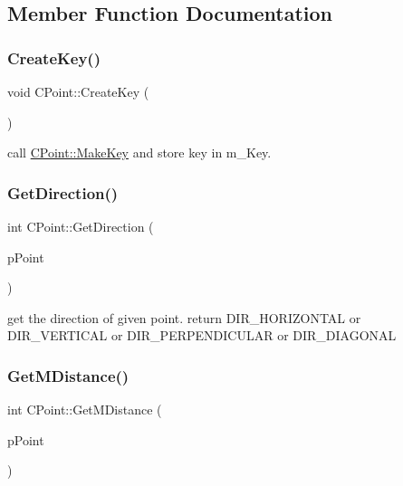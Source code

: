 \subsection{Member Function Documentation}
\mbox{\label{classCPoint_adff246311a759e9c7eaa5f5374dd3643}} 
\subsubsection{\texorpdfstring{CreateKey()}{CreateKey()}}
{\footnotesize\ttfamily void C\+Point\+::\+Create\+Key (\begin{DoxyParamCaption}{ }\end{DoxyParamCaption})}



call \mbox{\hyperlink{classCPoint_aa93327a1be5e5d9df55f3eb9750af25d}{C\+Point\+::\+Make\+Key}} and store key in m\+\_\+\+Key. 

\mbox{\label{classCPoint_add1e7b0b591f46026f281758a263da73}} 
\subsubsection{\texorpdfstring{GetDirection()}{GetDirection()}}
{\footnotesize\ttfamily int C\+Point\+::\+Get\+Direction (\begin{DoxyParamCaption}\item[{\mbox{\hyperlink{classCPoint}{C\+Point}} $\ast$}]{p\+Point }\end{DoxyParamCaption})}

get the direction of given point. return D\+I\+R\+\_\+\+H\+O\+R\+I\+Z\+O\+N\+T\+AL or D\+I\+R\+\_\+\+V\+E\+R\+T\+I\+C\+AL or D\+I\+R\+\_\+\+P\+E\+R\+P\+E\+N\+D\+I\+C\+U\+L\+AR or D\+I\+R\+\_\+\+D\+I\+A\+G\+O\+N\+AL \mbox{\label{classCPoint_a46b97b169fa384088ee36894fdf4c40d}} 
\subsubsection{\texorpdfstring{GetMDistance()}{GetMDistance()}}
{\footnotesize\ttfamily int C\+Point\+::\+Get\+M\+Distance (\begin{DoxyParamCaption}\item[{\mbox{\hyperlink{classCPoint}{C\+Point}} $\ast$}]{p\+Point }\end{DoxyParamCaption})}




